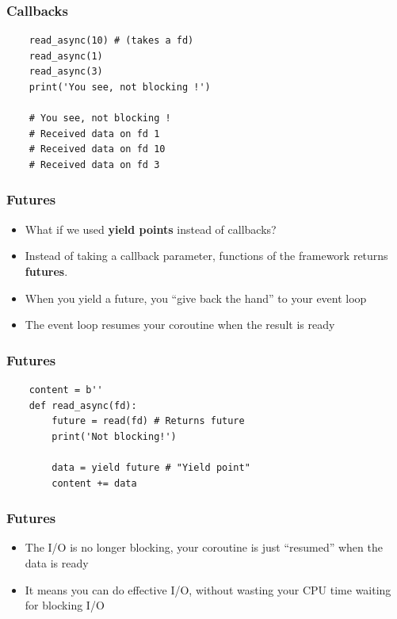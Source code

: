\documentclass[ignorenonframetext,]{beamer}
\begin{document}
\begin{frame}[fragile]\frametitle{Callbacks}

\begin{verbatim}
    read_async(10) # (takes a fd)
    read_async(1)
    read_async(3)
    print('You see, not blocking !')

    # You see, not blocking !
    # Received data on fd 1
    # Received data on fd 10
    # Received data on fd 3
\end{verbatim}

\end{frame}

\begin{frame}[fragile]\frametitle{Futures}

\begin{itemize}[<+->]
\itemsep1pt\parskip0pt
\item
  What if we used \textbf{yield points} instead of callbacks?
\item
  Instead of taking a callback parameter, functions of the framework
  returns \textbf{futures}.
\item
  When you yield a future, you ``give back the hand'' to your event loop
\item
  The event loop resumes your coroutine when the result is ready
\end{itemize}

\end{frame}

\begin{frame}[fragile]\frametitle{Futures}

\begin{verbatim}
    content = b''
    def read_async(fd):
        future = read(fd) # Returns future
        print('Not blocking!')

        data = yield future # "Yield point"
        content += data
\end{verbatim}

\end{frame}

\begin{frame}[fragile]\frametitle{Futures}

\begin{itemize}[<+->]
\itemsep1pt\parskip0pt
\item
  The I/O is no longer blocking, your coroutine is just ``resumed'' when
  the data is ready
\item
  It means you can do effective I/O, without wasting your CPU time
  waiting for blocking I/O
\end{itemize}

\end{frame}
\end{document}
